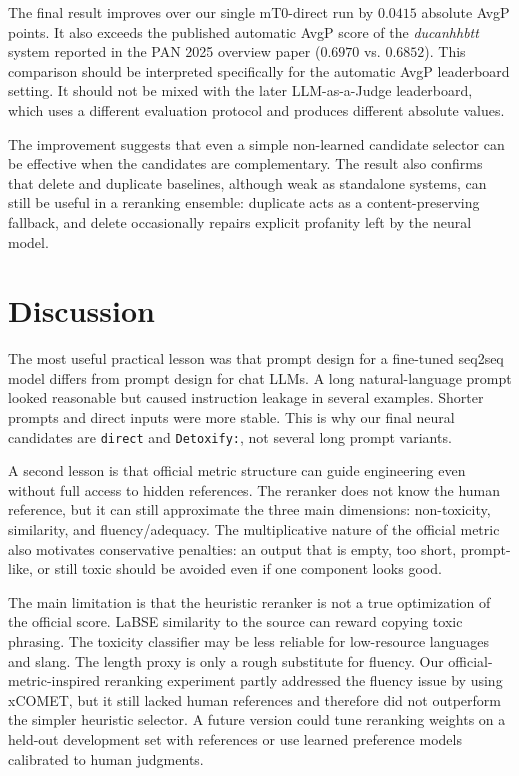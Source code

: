 \documentclass{article}
\begin{document}
The final result improves over our single mT0-direct run by $0.0415$ absolute AvgP points. It also exceeds the published automatic AvgP score of the \textit{ducanhhbtt} system reported in the PAN 2025 overview paper ($0.6970$ vs. $0.6852$). This comparison should be interpreted specifically for the automatic AvgP leaderboard setting. It should not be mixed with the later LLM-as-a-Judge leaderboard, which uses a different evaluation protocol and produces different absolute values.

The improvement suggests that even a simple non-learned candidate selector can be effective when the candidates are complementary. The result also confirms that delete and duplicate baselines, although weak as standalone systems, can still be useful in a reranking ensemble: duplicate acts as a content-preserving fallback, and delete occasionally repairs explicit profanity left by the neural model.

\section{Discussion}

The most useful practical lesson was that prompt design for a fine-tuned seq2seq model differs from prompt design for chat LLMs. A long natural-language prompt looked reasonable but caused instruction leakage in several examples. Shorter prompts and direct inputs were more stable. This is why our final neural candidates are \texttt{direct} and \texttt{Detoxify:}, not several long prompt variants.

A second lesson is that official metric structure can guide engineering even without full access to hidden references. The reranker does not know the human reference, but it can still approximate the three main dimensions: non-toxicity, similarity, and fluency/adequacy. The multiplicative nature of the official metric also motivates conservative penalties: an output that is empty, too short, prompt-like, or still toxic should be avoided even if one component looks good.

The main limitation is that the heuristic reranker is not a true optimization of the official score. LaBSE similarity to the source can reward copying toxic phrasing. The toxicity classifier may be less reliable for low-resource languages and slang. The length proxy is only a rough substitute for fluency. Our official-metric-inspired reranking experiment partly addressed the fluency issue by using xCOMET, but it still lacked human references and therefore did not outperform the simpler heuristic selector. A future version could tune reranking weights on a held-out development set with references or use learned preference models calibrated to human judgments.
\end{document}
